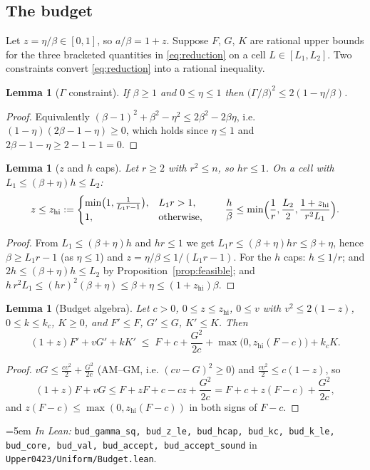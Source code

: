 \documentclass[11pt,a4paper]{article}
\newtheorem{lemma}[theorem]{Lemma}
\theoremstyle{definition}
\newcommand{\Lean}[1]{\texttt{#1}}
\newcommand{\file}[1]{\texttt{#1}}
\newcommand{\formal}[2]{%
  \par\smallskip
  \begingroup\small\raggedright\emergencystretch=5em
  \noindent\textit{In Lean:} \Lean{#1} in \file{#2}.\par
  \endgroup\smallskip}
\begin{document}
\subsection{The budget}

Let $z=\eta/\beta\in[0,1]$, so $a/\beta=1+z$. Suppose $F$, $G$, $K$ are rational
upper bounds for the three bracketed quantities in \eqref{eq:reduction} on a cell
$L\in[L_1,L_2]$. Two constraints convert \eqref{eq:reduction} into a rational
inequality.

\begin{lemma}[$\Gamma$ constraint]
  \label{lem:gammaconstraint}
  If $\beta\ge1$ and $0\le\eta\le1$ then
  $\bigl(\Gamma/\beta\bigr)^2\le2(1-\eta/\beta)$.
\end{lemma}
\begin{proof}
  Equivalently $(\beta-1)^2+\beta^2-\eta^2\le2\beta^2-2\beta\eta$, i.e.
  $(1-\eta)(2\beta-1-\eta)\ge0$, which holds since $\eta\le1$ and
  $2\beta-1-\eta\ge2-1-1=0$.
\end{proof}

\begin{lemma}[$z$ and $h$ caps]
  \label{lem:caps}
  Let $r\ge2$ with $r^2\le n$, so $hr\le1$. On a cell with
  $L_1\le(\beta+\eta)h\le L_2$:
  \[
    z\le z_{\mathrm{hi}}:=
    \begin{cases}
      \min\bigl(1,\tfrac{1}{L_1r-1}\bigr), & L_1r>1,\\
      1, & \text{otherwise},
    \end{cases}
    \qquad
    \frac h\beta\le \min\Bigl(\frac1r,\frac{L_2}{2},
      \frac{1+z_{\mathrm{hi}}}{r^2L_1}\Bigr) .
  \]
\end{lemma}
\begin{proof}
  From $L_1\le(\beta+\eta)h$ and $hr\le1$ we get
  $L_1r\le(\beta+\eta)hr\le\beta+\eta$, hence $\beta\ge L_1r-1$ (as $\eta\le1$)
  and $z=\eta/\beta\le1/(L_1r-1)$. For the $h$ caps: $h\le1/r$; and
  $2h\le(\beta+\eta)h\le L_2$ by Proposition~\ref{prop:feasible};
  and $h\,r^2L_1\le(hr)^2(\beta+\eta)\le\beta+\eta\le(1+z_{\mathrm{hi}})\beta$.
\end{proof}

\begin{lemma}[Budget algebra]
  \label{lem:budget}
  Let $c>0$, $0\le z\le z_{\mathrm{hi}}$, $0\le v$ with $v^2\le2(1-z)$,
  $0\le k\le k_c$, $K\ge0$, and $F'\le F$, $G'\le G$, $K'\le K$. Then
  \[
    (1+z)F'+vG'+kK'
    \;\le\; F+c+\frac{G^2}{2c}+\max\bigl(0,z_{\mathrm{hi}}(F-c)\bigr)+k_cK .
  \]
\end{lemma}
\begin{proof}
  $vG\le \tfrac{c v^2}{2}+\tfrac{G^2}{2c}$ (AM--GM, i.e.
  $(cv-G)^2\ge0$) and $\tfrac{cv^2}{2}\le c(1-z)$, so
  \[
    (1+z)F+vG\le F+zF+c-cz+\frac{G^2}{2c}
    = F+c+z(F-c)+\frac{G^2}{2c},
  \]
  and $z(F-c)\le\max(0,z_{\mathrm{hi}}(F-c))$ in both signs of $F-c$.
\end{proof}
\formal{bud\_gamma\_sq, bud\_z\_le, bud\_hcap, bud\_kc, bud\_k\_le, bud\_core, bud\_val, bud\_accept, bud\_accept\_sound}{Upper0423/Uniform/Budget.lean}
\end{document}
